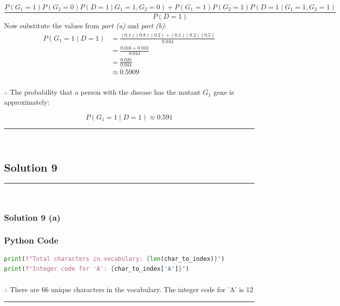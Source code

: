 \documentclass{article}
\begin{document}
$$\frac{P(G_1=1)P(G_2=0)P(D=1 \mid G_1=1, G_2=0)+P(G_1=1)P(G_2=1)P(D=1 \mid G_1=1, G_2=1)}{P(D=1)}$$
Now substitute the values from \textit{part (a)} and \textit{part (b)}:
\begin{align*}
    P(G_1=1 \mid D=1) &= \frac{(0.1)(0.8)(0.2) + (0.1)(0.2)(0.5)}{0.044} \\
                 &= \frac{0.016 + 0.010}{0.044} \\
                 &= \frac{0.026}{0.044} \\
                 &\approx 0.5909
\end{align*}
\subsubsection*{\normalfont}{$\therefore$ The probability that a person with the disease has the mutant $G_1$ gene is approximately:}

$$P(G_1=1 \mid D=1) \approx 0.591$$

\noindent\rule{\textwidth}{0.4pt}\\

\newpage

\subsection*{Solution 9}
\noindent\rule{\textwidth}{0.4pt}\\
\subsubsection*{Solution 9 (a)}
\subsubsection*{Python Code}
\begin{lstlisting}[language=Python]
print(f"Total characters in vocabulary: {len(char_to_index)}")
print(f"Integer code for 'A': {char_to_index['A']}")
\end{lstlisting}
\subsubsection*{\normalfont}{$\therefore$ There are 66 unique characters in the vocabulary. The integer code for 'A' is 12}

\noindent\rule{\textwidth}{0.4pt}\\

\newpage
\end{document}
